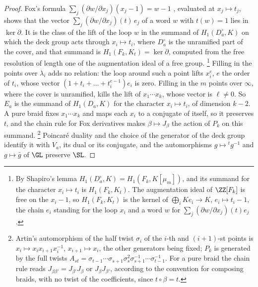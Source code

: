 \begin{proof}
Fox's formula $\sum_{j}(\partial w/\partial x_{j})(x_{j}-1)=w-1$ \cite{Fox53},
evaluated at $x_{j}\mapsto t_{j}$, shows that the vector
$\sum_{j}(\partial w/\partial x_{j})(t)\,e_{j}$ of a word $w$ with $t(w)=1$ lies
in $\ker\partial$. It is the class of the lift of the loop $w$ in the summand
of $H_{1}(D_{a}^{\circ},K)$ on which the deck group acts through
$x_{i}\mapsto t_{i}$, where $D_{a}^{\circ}$ is the unramified part of the
cover, and that summand is $H_{1}(F_{k},K_{t})=\ker\partial$, computed from the
free resolution of length one of the augmentation ideal of a free group.%
\footnote{By Shapiro's lemma $H_{1}(D_{a}^{\circ},K)=H_{1}(F_{k},K[\mu_{m}])$,
and its summand for the character $x_{i}\mapsto t_{i}$ is $H_{1}(F_{k},K_{t})$.
The augmentation ideal of $\ZZ[F_{k}]$ is free on the $x_{i}-1$, so
$H_{1}(F_{k},K_{t})$ is the kernel of $\bigoplus_{i}Ke_{i}\to K$,
$e_{i}\mapsto t_{i}-1$, the chain $e_{i}$ standing for the loop $x_{i}$ and a word
$w$ for $\sum_{j}(\partial w/\partial x_{j})(t)e_{j}$.} Filling in the points
over $\lambda_{i}$ adds no relation: the loop around such a point lifts
$x_{i}^{e}$, $e$ the order of $t_{i}$, whose vector
$(1+t_{i}+\dots+t_{i}^{e-1})e_{i}$ is zero. Filling in the $m$ points over
$\infty$, where the cover is unramified, kills the lift of $x_{1}\cdots
x_{k}$, whose vector is $\ell\ne0$. So $E_{a}$ is the summand of
$H_{1}(D_{a},K)$ for the character $x_{i}\mapsto t_{i}$, of dimension $k-2$. A
pure braid fixes $x_{1}\cdots x_{k}$ and maps each $x_{i}$ to a conjugate of
itself, so it preserves $t$, and the chain rule for Fox derivatives makes
$\beta\mapsto J_{\beta}$ the action of $P_{k}$ on this summand.%
\footnote{Artin's automorphism of the half twist $\sigma_{i}$ of the $i$-th
and $(i+1)$-st points is $x_{i}\mapsto x_{i}x_{i+1}x_{i}^{-1}$,
$x_{i+1}\mapsto x_{i}$, the other generators being fixed; $P_{k}$ is generated
by the full twists $A_{st}=\sigma_{t-1}\cdots\sigma_{s+1}\sigma_{s}^{2}
\sigma_{s+1}^{-1}\cdots\sigma_{t-1}^{-1}$. For a pure braid the chain rule
reads $J_{\beta\beta'}=J_{\beta'}J_{\beta}$ or $J_{\beta}J_{\beta'}$, according
to the convention for composing braids, with no twist of the coefficients,
since $t\circ\beta=t$.} Poincar\'e duality and the choice of the generator
of the deck group identify it with $V_{a}$, its dual or its conjugate, and
the automorphisms $g\mapsto{}^{t}g^{-1}$ and $g\mapsto\bar g$ of $\GL$ preserve
$\SL$.
\end{proof}

